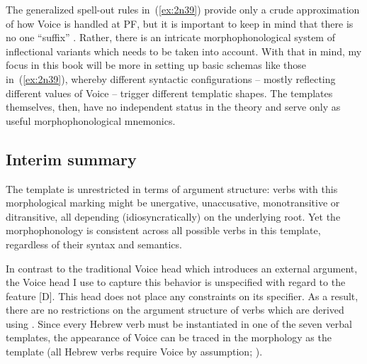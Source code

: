 \begin{exe}
\begin{xlist}
\begin{exe}
\begin{xlist}
\begin{exe}
\begin{xlist}
\begin{exe}
\begin{exe}
\begin{xlist}
\begin{exe}
\begin{xlist}
\begin{exe}
\begin{xlist}
\begin{exe}
\begin{xlist}
\begin{exe}
\begin{xlist}
\begin{exe}
\begin{xlist}
\begin{exe}
\begin{xlist}
\begin{exe}
\begin{xlist}
\begin{exe}
\begin{xlist}
\begin{exe}
\begin{xlist}
\begin{exe}
\begin{xlist}
\begin{exe}
\begin{xlist}
\begin{exe}
\begin{exe}
\begin{xlist}
\begin{exe}
\begin{xlist}
\begin{exe}
\begin{xlist}
\begin{exe}
\begin{xlist}
{\begin{exe}
\begin{xlist}
\begin{exe}
\begin{xlist}
\begin{exe}
\begin{xlist}
\begin{exe}
\begin{xlist}
\begin{xlist}
\begin{xlist}
\begin{exe}
\begin{xlist}
\begin{xlist}
\begin{xlist}
\begin{exe}
\begin{exe}
\begin{xlist}
The generalized spell-out rules in~(\ref{ex:2n39}) provide only a crude approximation of how Voice is handled at PF, but it is important to keep in mind that there is no one ``suffix'' {\tkal}. Rather, there is an intricate morphophonological system of inflectional variants which needs to be taken into account. With that in mind, my focus in this book will be more in setting up basic schemas like those in~(\ref{ex:2n39}), whereby different syntactic configurations -- mostly reflecting different values of Voice -- trigger different templatic shapes. The templates themselves, then, have no independent status in the theory and serve only as useful morphophonological mnemonics.

	\subsection{Interim summary} \label{voice:voice:sum}
The template {\tkal} is unrestricted in terms of argument structure: verbs with this morphological marking might be unergative, unaccusative, monotransitive or ditransitive, all depending (idiosyncratically) on the underlying root. Yet the morphophonology is consistent across all possible verbs in this template, regardless of their syntax and semantics.

In contrast to the traditional Voice head which introduces an external argument, the Voice head I use to capture this behavior is unspecified with regard to the  feature [D]. This head does not place any constraints on its specifier. As a result, there are no restrictions on the argument structure of verbs which are derived using . Since every Hebrew verb must be instantiated in one of the seven verbal templates, the appearance of Voice can be traced in the morphology as the template {\tkal} (all Hebrew verbs require Voice by assumption; \citealt{arad05}).


\end{xlist}
\end{exe}
\end{exe}
\end{xlist}
\end{xlist}
\end{xlist}
\end{exe}
\end{xlist}
\end{xlist}
\end{xlist}
\end{exe}
\end{xlist}
\end{exe}
\end{xlist}
\end{exe}
\end{xlist}
\end{exe}}
\end{xlist}
\end{exe}
\end{xlist}
\end{exe}
\end{xlist}
\end{exe}
\end{xlist}
\end{exe}
\end{exe}
\end{xlist}
\end{exe}
\end{xlist}
\end{exe}
\end{xlist}
\end{exe}
\end{xlist}
\end{exe}
\end{xlist}
\end{exe}
\end{xlist}
\end{exe}
\end{xlist}
\end{exe}
\end{xlist}
\end{exe}
\end{xlist}
\end{exe}
\end{xlist}
\end{exe}
\end{xlist}
\end{exe}
\end{xlist}
\end{exe}
\end{exe}
\end{xlist}
\end{exe}
\end{xlist}
\end{exe}
\end{xlist}
\end{exe}
